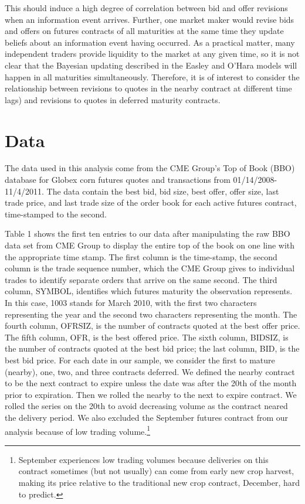 \documentclass[]{elsarticle} %
\begin{document}
This should induce a high degree of correlation between bid and offer
revisions when an information event arrives. Further, one market maker
would revise bids and offers on futures contracts of all maturities at
the same time they update beliefs about an information event having
occurred. As a practical matter, many independent traders provide
liquidity to the market at any given time, so it is not clear that the
Bayesian updating described in the Easley and O'Hara models will happen
in all maturities simultaneously. Therefore, it is of interest to
consider the relationship between revisions to quotes in the nearby
contract at different time lags) and revisions to quotes in deferred
maturity contracts.

\section{Data}\label{data}

The data used in this analysis come from the CME Group's Top of Book
(BBO) database for Globex corn futures quotes and transactions from
01/14/2008-11/4/2011. The data contain the best bid, bid size, best
offer, offer size, last trade price, and last trade size of the order
book for each active futures contract, time-stamped to the second.

Table 1 shows the first ten entries to our data after manipulating the
raw BBO data set from CME Group to display the entire top of the book on
one line with the appropriate time stamp. The first column is the
time-stamp, the second column is the trade sequence number, which the
CME Group gives to individual trades to identify separate orders that
arrive on the same second. The third column, SYMBOL, identifies which
futures maturity the observation represents. In this case, 1003 stands
for March 2010, with the first two characters representing the year and
the second two characters representing the month. The fourth column,
OFRSIZ, is the number of contracts quoted at the best offer price. The
fifth column, OFR, is the best offered price. The sixth column, BIDSIZ,
is the number of contracts quoted at the best bid price; the last
column, BID, is the best bid price. For each date in our sample, we
consider the first to mature (nearby), one, two, and three contracts
deferred. We defined the nearby contract to be the next contract to
expire unless the date was after the 20th of the month prior to
expiration. Then we rolled the nearby to the next to expire contract. We
rolled the series on the 20th to avoid decreasing volume as the contract
neared the delivery period. We also excluded the September futures
contract from our analysis because of low trading volume.\footnote{September
  experiences low trading volumes because deliveries on this contract
  sometimes (but not usually) can come from early new crop harvest,
  making its price relative to the traditional new crop contract,
  December, hard to predict.}
\end{document}
